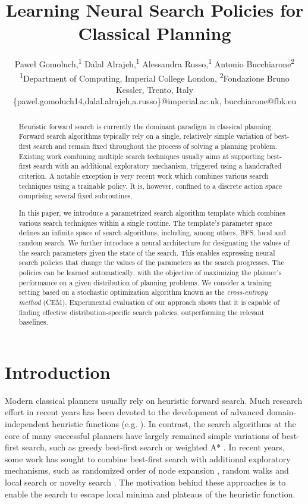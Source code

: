 \documentclass[letterpaper]{article} %
\title{Learning Neural Search Policies for Classical Planning}
\author{
Pawe\l{} Gomoluch,\textsuperscript{\rm 1} Dalal Alrajeh,\textsuperscript{\rm 1} Alessandra Russo,\textsuperscript{\rm 1} Antonio Bucchiarone\textsuperscript{\rm 2}\\
\textsuperscript{\rm 1}Department of Computing, Imperial College London, \textsuperscript{\rm 2}Fondazione Bruno Kessler, Trento, Italy\\
\{pawel.gomoluch14,dalal.alrajeh,a.russo\}@imperial.ac.uk, bucchiarone@fbk.eu
}
\begin{document}
\maketitle

\begin{abstract}
Heuristic forward search is currently the dominant paradigm in classical planning.
Forward search algorithms typically rely on a single, relatively simple variation of best-first search and remain fixed throughout the process of solving a planning problem.
Existing work combining multiple search techniques usually aims at supporting best-first search with an additional exploratory mechanism, triggered using a handcrafted criterion.
A notable exception is very recent work which combines various search techniques using a trainable policy. It is, however, confined to a discrete action space comprising several fixed subroutines.

In this paper, we introduce a parametrized search algorithm template which combines various search techniques within a single routine. The template's parameter space defines an infinite space of search algorithms, including, among others, BFS, local and random search. We further introduce a neural architecture for designating the values of the search parameters given the state of the search. This enables expressing neural search policies that change the values of the parameters as the search progresses. The policies can be learned automatically, with the objective of maximizing the planner's performance on a given distribution of planning problems. We consider a training setting based on a stochastic optimization algorithm known as the \emph{cross-entropy method} (CEM).
Experimental evaluation of our approach shows that it is capable of finding effective distribution-specific search policies, outperforming the relevant baselines.
\end{abstract}


\section{Introduction}

Modern classical planners usually rely on heuristic forward search. Much research effort in recent years has been devoted to the development of advanced domain-independent heuristic functions (e.g. \cite{Hoffmann2001,Helmert2006,Richter2010,Domshlak2015}). In contrast, the search algorithms at the core of many successful planners have largely remained simple variations of best-first search, such as greedy best-first search \cite{Helmert2006} or weighted A* \cite{Richter2010}. In recent years, some work has sought to combine best-first search with additional exploratory mechanisms, such as randomized order of node expansion \cite{Valenzano2014,Asai2017}, random walks and local search \cite{Xie2014} or novelty search \cite{Lipovetzky2017}. The motivation behind these approaches is to enable the search to escape local minima and plateaus of the heuristic function.
\end{document}
